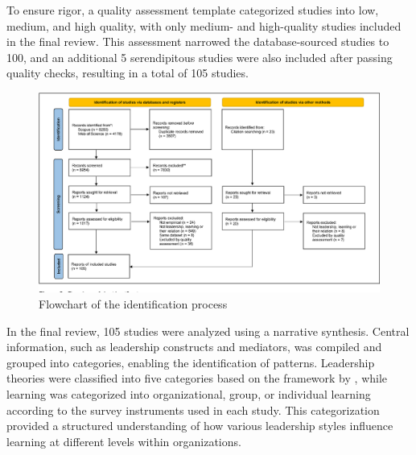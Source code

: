 To ensure rigor, a quality assessment template \cite{Tompa2007} categorized studies into low,
medium, and high quality, with only medium- and high-quality studies included in the final review.
This assessment narrowed the database-sourced studies to 100, and an additional 5 serendipitous
studies were also included after passing quality checks, resulting in a total of 105 studies.

\begin{figure}
    \centering
    \includegraphics[width=0.9\linewidth]{figures/identification-process.png}
    \caption{Flowchart of the identification process \cite{Lundqvist2022LeadershipAL}}
    \label{fig:identification-process}
\end{figure}

In the final review, 105 studies were analyzed using a narrative synthesis. Central information,
such as leadership constructs and mediators, was compiled and grouped into categories, enabling the
identification of patterns. Leadership theories were classified into five categories based on the
framework by \cite{DINH201436}, while learning was categorized into organizational, group, or
individual learning according to the survey instruments used in each study. This categorization
provided a structured understanding of how various leadership styles influence learning at different
levels within organizations.
